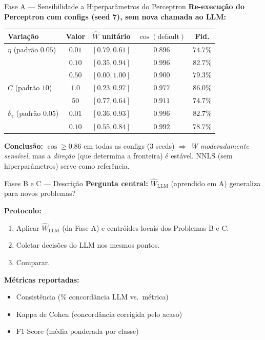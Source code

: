 \documentclass[aspectratio=169,10pt]{beamer}
\begin{document}
\begin{frame}{Fase A --- Sensibilidade a Hiperpar\^ametros do Perceptron}
  \scriptsize
  \textbf{Re-execu\c{c}\~ao do Perceptron com configs (seed 7), sem nova chamada ao LLM:}
  \begin{center}
  \begin{tabular}{lcccc}
    \toprule
    \textbf{Varia\c{c}\~ao} & \textbf{Valor} & $\hat{W}$ unit\'ario & $\cos(\text{default})$ & \textbf{Fid.} \\
    \midrule
    $\eta$ (padr\~ao $0.05$) & $0.01$ & $[0.79, 0.61]$ & $0.896$ & $74.7\%$ \\
                             & $0.10$ & $[0.35, 0.94]$ & $0.996$ & $82.7\%$ \\
                             & $0.50$ & $[0.00, 1.00]$ & $0.900$ & $79.3\%$ \\
    \midrule
    $C$ (padr\~ao $10$)      & $1.0$  & $[0.23, 0.97]$ & $0.977$ & $86.0\%$ \\
                             & $50$   & $[0.77, 0.64]$ & $0.911$ & $74.7\%$ \\
    \midrule
    $\delta_\gamma$ (padr\~ao $0.05$) & $0.01$ & $[0.36, 0.93]$ & $0.996$ & $82.7\%$ \\
                                       & $0.10$ & $[0.55, 0.84]$ & $0.992$ & $78.7\%$ \\
    \bottomrule
  \end{tabular}
  \end{center}
  \medskip

  \textbf{Conclus\~ao:} $\cos \geq 0.86$ em todas as configs (3 seeds) $\Rightarrow$ \emph{W moderadamente sens\'ivel}, mas a \emph{dire\c{c}\~ao} (que determina a fronteira) \'e est\'avel. NNLS (sem hiperpar\^ametros) serve como refer\^encia.
\end{frame}

\begin{frame}{Fases B e C --- Descri\c{c}\~ao}
  \textbf{Pergunta central:} $\hat{W}_{\text{LLM}}$ (aprendido em A) generaliza para novos problemas?
  \medskip

  \textbf{Protocolo:}
  \begin{enumerate}
    \item Aplicar $\hat{W}_{\text{LLM}}$ (da Fase A) e centr\'oides locais dos Problemas B e C.
    \item Coletar decis\~oes do LLM nos mesmos pontos.
    \item Comparar.
  \end{enumerate}
  \medskip

  \textbf{M\'etricas reportadas:}
  \begin{itemize}
    \item Consist\^encia (\% concord\^ancia LLM vs.\ m\'etrica)
    \item Kappa de Cohen (concord\^ancia corrigida pelo acaso)
    \item F1-Score (m\'edia ponderada por classe)
  \end{itemize}
\end{frame}
\end{document}
